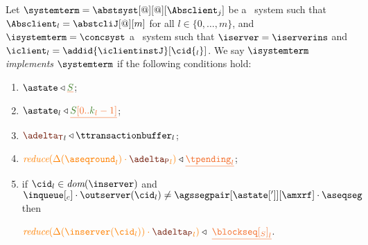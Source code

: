 \begin{definition} \label{def:implementation}
Let  $\systemterm = \abstsyst[@][@][\Absclient_j]$ be a \tgspcalculus\ system
 such that $\Absclient_l={\abstcliJ[@][m]}$ for all
$l\in\{0,\ldots,m\}$, and  $\isystemterm = \concsyst$  a \igsp\  system such that  $\iserver = \iserverins$ and $\iclient_l = \addid{\iclientinstJ}[{\cid{_l}}]$.
 We say {\em $\isystemterm$ implements $\systemterm$} if the following conditions hold:

\begin{enumerate}
	\item \label{prop_stateserver} $\astate \triangleleft \flatten{\queuemessage}$;

	\item \label{prop_state_known} $\astate_l \triangleleft \flatten {\queuemessage[0 .. \tknown_l - 1]}$;
	
	\item \label{prop_transactions} ${\transactionbuffer}_l\triangleleft{\ttransactionbuffer}_l$;
	
	\item \label{prop_pending}  
		$\ireduce{\igetdeltas{\pending_l}\cdot {\pushbuffer}_l} \triangleleft \flatten{\tpending_l}$;


	\item \label{prop_sent}  
	   
	   if $\cid_l \in \dom\inserver$ and $\inclient \cdot\outserver(\cid_l) \neq \agssegpair[{\astate[']}][{\amxrf}]\cdot\aseqseg$ %
	   then 
	   
	   $ \ireduce{\igetdeltas{\inserver(\cid_l)}\cdot {\pushbuffer}_l} \triangleleft \ \flatten{{\tsent}_l}$. 
	 


\end{enumerate}
\end{definition}
